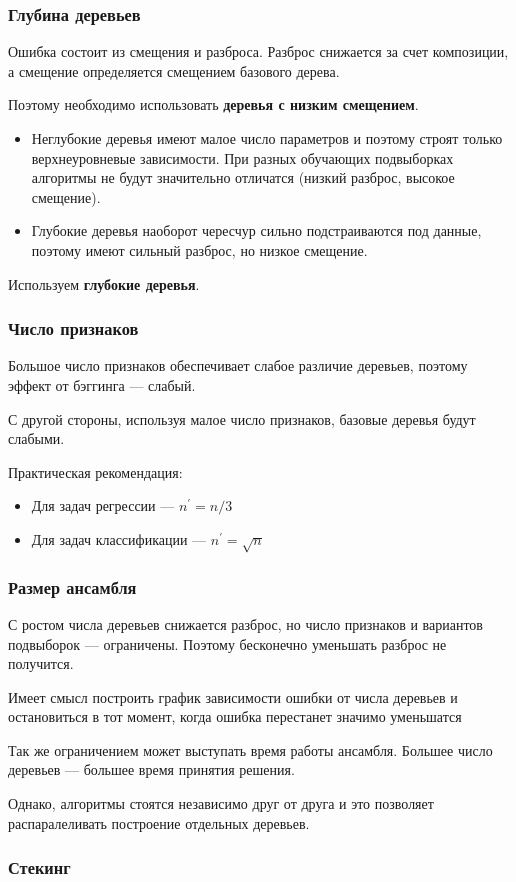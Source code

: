 \documentclass{beamer}
\begin{document}
	\begin{frame}
		\frametitle{Глубина деревьев}

		Ошибка состоит из смещения и разброса.
		Разброс снижается за счет композиции, а смещение определяется смещением базового дерева.

		Поэтому необходимо использовать \textbf{деревья с низким смещением}.
		\begin{itemize}
			\item Неглубокие деревья имеют малое число параметров и поэтому строят только верхнеуровневые зависимости.
			При разных обучающих подвыборках алгоритмы не будут значительно отличатся (низкий разброс, высокое смещение).
			\item Глубокие деревья наоборот чересчур сильно подстраиваются под данные, поэтому имеют сильный разброс, но низкое смещение.
		\end{itemize}
		\vspace{15pt}

		Используем \textbf{глубокие деревья}.
	\end{frame}

	\begin{frame}
		\frametitle{Число признаков}

		Большое число признаков обеспечивает слабое различие деревьев, поэтому эффект
		от бэггинга --- слабый.

		С другой стороны, используя малое число признаков, базовые деревья будут слабыми.

		\vspace{15pt}

		Практическая рекомендация:
		\begin{itemize}
			\item Для задач регрессии --- $n^{'} = n / 3$
			\item Для задач классификации --- $n^{'} = \sqrt{n}$
		\end{itemize}
	\end{frame}

	\begin{frame}
		\frametitle{Размер ансамбля}

		С ростом числа деревьев снижается разброс, но число признаков и вариантов подвыборок --- ограничены.
		Поэтому бесконечно уменьшать разброс не получится.

		\vspace{15pt}

		Имеет смысл построить график зависимости ошибки от числа деревьев и остановиться в тот момент, когда
		ошибка перестанет значимо уменьшатся

		\vspace{15pt}

		Так же ограничением может выступать время работы ансамбля. Большее число деревьев --- большее время принятия решения.

		Однако, алгоритмы стоятся независимо друг от друга и это позволяет распаралеливать построение отдельных деревьев.
	\end{frame}

	\begin{frame}
		\frametitle{Стекинг}
		
	\end{frame}
\end{document}
